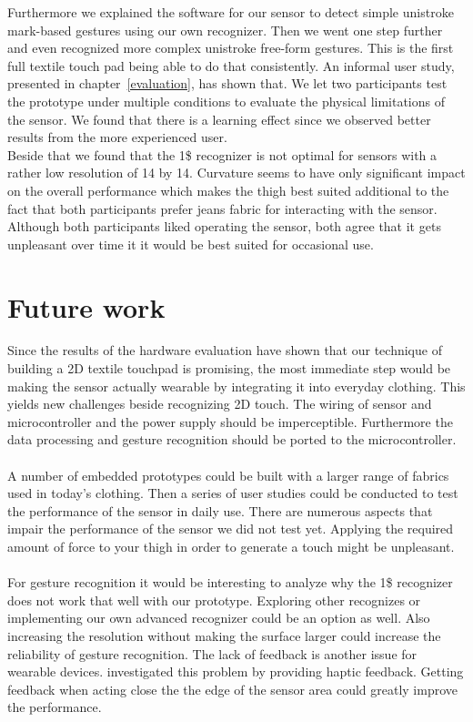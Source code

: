 Furthermore we explained the software for our sensor to detect simple unistroke mark-based gestures using our own recognizer. Then we went one step further and even recognized more complex unistroke free-form gestures. This is the first full textile touch pad being able to do that consistently. An informal user study, presented in chapter~\ref{evaluation}, has shown that. 
We let two participants test the prototype under multiple conditions to evaluate the physical limitations of the sensor. We found that there is a learning effect since we observed better results from the more experienced user. 
\\
Beside that we found that the 1\$ recognizer is not optimal for sensors with a rather low resolution of 14 by 14. Curvature seems to have only significant impact on the overall performance which makes the thigh best suited additional to the fact that both participants prefer jeans fabric for interacting with the sensor. Although both participants liked operating the sensor, both agree that it gets unpleasant over time it it would be best suited for occasional use.

\section{Future work}
\label{summaryandfuturework.futurework}
Since the results of the hardware evaluation have shown that our technique of building a 2D textile touchpad is promising, the most immediate step would  be making the sensor actually wearable by integrating it into everyday clothing. This yields new challenges beside recognizing 2D touch. The wiring of sensor and microcontroller and the power supply should be imperceptible. Furthermore the data processing and gesture recognition should be ported to the microcontroller. 
\\ \\
A number of embedded prototypes could be built with a larger range of fabrics used in today's clothing. Then a series of user studies could be conducted to test the performance of the sensor in daily use. There are numerous aspects that impair the performance of the sensor we did not test yet. Applying the required amount of force to your thigh in order to generate a touch might be unpleasant.
\\ \\
For gesture recognition it would be interesting to analyze why the 1\$ recognizer does not work that well with our prototype. Exploring other recognizes or implementing our own advanced recognizer could be an option as well. Also increasing the resolution without making the surface larger could increase the reliability of gesture recognition. The lack of feedback is another issue for wearable devices. \cite{6636291} investigated this problem by providing haptic feedback. Getting feedback when acting close the the edge of the sensor area could greatly improve the performance. 
